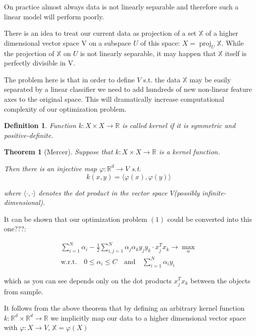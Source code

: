 \documentclass{article}
\DeclareMathOperator{\proj}{proj}
\theoremstyle{bfnote}
\newtheorem{defi}{Definition}
\newtheorem{thm}{Theorem}
\begin{document}
	On practice almost always data is not linearly separable and therefore such a linear model will perform poorly.
	
	There is an idea to treat our current data as projection of a set $\mathbb{X}$ of a higher dimensional vector space V on a subspace $U$ of this space: $X=\proj_U \mathbb{X}$. While the projection of $\mathbb{X}$ on $U$ is not linearly separable, it may happen that $\mathbb{X}$ itself is perfectly divisible in V.
	
	The problem here is that in order to define $V$ s.t. the data $\mathbb{X}$ may be easily separated by a linear classifier
	we need to add hundreds of new non-linear feature axes to the original space. This will dramatically increase computational complexity of our optimization problem.
	
	\begin{defi}
	Function $k: X \times X \rightarrow \mathbb{R}$ is called kernel if it is symmetric and positive-definite.
	\end{defi}
	
	\begin{thm}[Mercer]
		
		Suppose that $k: X \times X \rightarrow \mathbb{R}$ is a kernel function.

		Then there is an injective map $\varphi: \mathbb{R}^d \rightarrow V$ s.t. 
		$$k(x, y) = \langle \varphi(x), \varphi(y) \rangle$$ 
		
		where $\langle \cdot , \cdot \rangle$ denotes the dot product in the vector space $V$(possibly infinite-dimensional).
		
	\end{thm}	

	
	It can be shown that our optimization problem $(1)$ could be converted into this one???:
	
	\begin{gather}
	\sum_{i=1}^N {\alpha_i} - \frac{1}{2}\sum_{i,j=1}^N \alpha_j \alpha_k y_j y_k \cdot x_j^T x_k
	\rightarrow \max\limits_{\alpha} \\
	\text{w.r.t.} \quad 0 \le \alpha_i \le C \quad \text{and} \quad \sum_{i=1}^N \alpha_i y_i
	\end{gather}
	
	which as you can see depends only on the dot products $x_j^T x_k$ between the objects from sample.



	It follows from the above theorem that by defining an arbitrary kernel function
	$k:\mathbb{R}^d \times \mathbb{R}^d \rightarrow \mathbb{R}$ 
	we implicitly map our data to a higher dimensional vector space with $\varphi: X \rightarrow V$, $\mathbb{X} = \varphi(X)$
	
\end{document}
